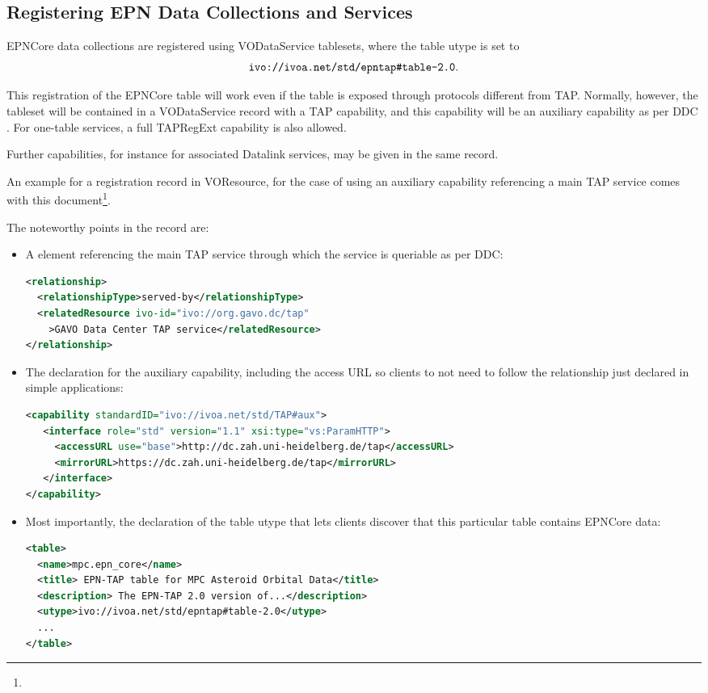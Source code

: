 \documentclass[11pt,a4paper]{ivoa}
\begin{document}
\subsection{Registering EPN Data Collections and Services}

EPNCore data collections are registered using VODataService
\citep{2010ivoa.spec.1202P} tablesets, where the table utype is set to
$$\hbox{\verb|ivo://ivoa.net/std/epntap#table-2.0|}.$$

This registration of the EPNCore table will work even if the table is
exposed through protocols different from TAP.  Normally, however, the
tableset will be contained in a VODataService 
record with a TAP capability, and this capability will be an auxiliary
capability as per DDC \citep{2019ivoa.spec.0520D}.  For one-table
services, a full TAPRegExt \citep{2012ivoa.spec.0827D} capability is also
allowed.

Further capabilities, for instance for associated Datalink services,
may be given in the same record.

An example for a registration record in VOResource, for the case of
using an auxiliary capability referencing a main TAP service comes with
this document\footnote{}.

The noteworthy points in the record are:

\begin{itemize}
\item A  element referencing the main TAP service
through which the service is queriable as per DDC:
\begin{lstlisting}[language=XML,basicstyle=\footnotesize]
<relationship>
  <relationshipType>served-by</relationshipType>
  <relatedResource ivo-id="ivo://org.gavo.dc/tap"
    >GAVO Data Center TAP service</relatedResource>
</relationship>
\end{lstlisting}

\item The declaration for the auxiliary capability, including the access
URL so clients to not need to follow the relationship just declared in
simple applications:
\begin{lstlisting}[language=XML,basicstyle=\footnotesize]
<capability standardID="ivo://ivoa.net/std/TAP#aux">
   <interface role="std" version="1.1" xsi:type="vs:ParamHTTP">
     <accessURL use="base">http://dc.zah.uni-heidelberg.de/tap</accessURL>
     <mirrorURL>https://dc.zah.uni-heidelberg.de/tap</mirrorURL>
   </interface>
</capability>
\end{lstlisting}

\item Most importantly, the declaration of the table utype that lets
clients discover that this particular table contains EPNCore data:
\begin{lstlisting}[language=XML,basicstyle=\footnotesize]
<table>
  <name>mpc.epn_core</name>
  <title> EPN-TAP table for MPC Asteroid Orbital Data</title>
  <description> The EPN-TAP 2.0 version of...</description>
  <utype>ivo://ivoa.net/std/epntap#table-2.0</utype>
  ...
</table>
\end{lstlisting}
\end{itemize}
\end{document}
